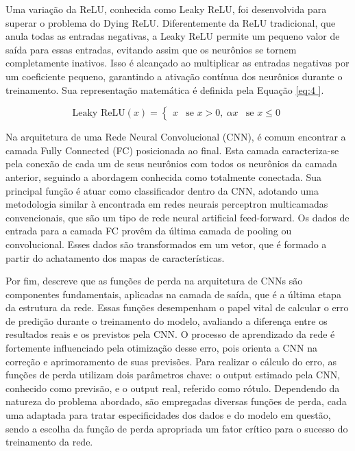 Uma variação da ReLU, conhecida como Leaky ReLU, foi desenvolvida para superar o problema do Dying ReLU. Diferentemente da ReLU tradicional, que anula todas as entradas negativas, a Leaky ReLU permite um pequeno valor de saída para essas entradas, evitando assim que os neurônios se tornem completamente inativos. Isso é alcançado ao multiplicar as entradas negativas por um coeficiente pequeno, garantindo a ativação contínua dos neurônios durante o treinamento. Sua representação matemática é definida pela Equação \ref{eq:4
}.

\begin{equation}
\text{Leaky ReLU}(x) = \begin{cases}
x & \text{se } x > 0, \
\alpha x & \text{se } x \leq 0
\end{cases}
\label{eq:4
}
\end{equation}

Na arquitetura de uma Rede Neural Convolucional (CNN), é comum encontrar a camada Fully Connected (FC) posicionada ao final. Esta camada caracteriza-se pela conexão de cada um de seus neurônios com todos os neurônios da camada anterior, seguindo a abordagem conhecida como totalmente conectada. Sua principal função é atuar como classificador dentro da CNN, adotando uma metodologia similar à encontrada em redes neurais perceptron multicamadas convencionais, que são um tipo de rede neural artificial feed-forward. Os dados de entrada para a camada FC provêm da última camada de pooling ou convolucional. Esses dados são transformados em um vetor, que é formado a partir do achatamento dos mapas de características.

Por fim, \textcite{Alzubaidi2021} descreve que as funções de perda na arquitetura de CNNs são componentes fundamentais, aplicadas na camada de saída, que é a última etapa da estrutura da rede. Essas funções desempenham o papel vital de calcular o erro de predição durante o treinamento do modelo, avaliando a diferença entre os resultados reais e os previstos pela CNN. O processo de aprendizado da rede é fortemente influenciado pela otimização desse erro, pois orienta a CNN na correção e aprimoramento de suas previsões. Para realizar o cálculo do erro, as funções de perda utilizam dois parâmetros chave: o output estimado pela CNN, conhecido como previsão, e o output real, referido como rótulo. Dependendo da natureza do problema abordado, são empregadas diversas funções de perda, cada uma adaptada para tratar especificidades dos dados e do modelo em questão, sendo a escolha da função de perda apropriada um fator crítico para o sucesso do treinamento da rede.

